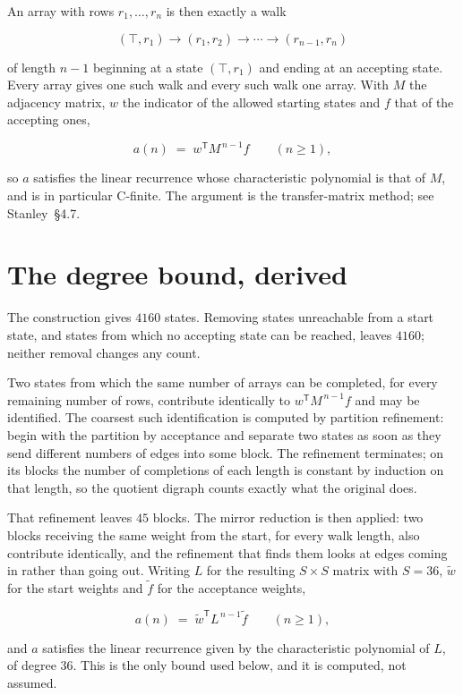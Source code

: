 \documentclass[11pt]{article}
\theoremstyle{definition}
\begin{document}
An array with rows $r_1,\dots,r_n$ is then exactly a walk

\[(\top,r_1) \to (r_1,r_2) \to \cdots \to (r_{n-1},r_n)\]

of length $n-1$ beginning at a state $(\top,r_1)$ and ending at an accepting state. Every array gives one such walk and every such walk one array. With $M$ the adjacency matrix, $w$ the indicator of the allowed starting states and $f$ that of the accepting ones,

\[a(n) \;=\; w^{\mathsf T} M^{\,n-1} f \qquad (n \ge 1),\]

so $a$ satisfies the linear recurrence whose characteristic polynomial is that of $M$, and is in particular C-finite. The argument is the transfer-matrix method; see Stanley~\S4.7.

\section{The degree bound, derived}

The construction gives $4160$ states. Removing states unreachable from a start state, and states from which no accepting state can be reached, leaves $4160$; neither removal changes any count.

Two states from which the same number of arrays can be completed, for every remaining number of rows, contribute identically to $w^{\mathsf T}M^{\,n-1}f$ and may be identified. The coarsest such identification is computed by partition refinement: begin with the partition by acceptance and separate two states as soon as they send different numbers of edges into some block. The refinement terminates; on its blocks the number of completions of each length is constant by induction on that length, so the quotient digraph counts exactly what the original does.

That refinement leaves $45$ blocks. The mirror reduction is then applied: two blocks receiving the same weight from the start, for every walk length, also contribute identically, and the refinement that finds them looks at edges coming in rather than going out. Writing $L$ for the resulting $S \times S$ matrix with $S = 36$, $\tilde w$ for the start weights and $\tilde f$ for the acceptance weights,

\[a(n) \;=\; \tilde w^{\mathsf T} L^{\,n-1} \tilde f \qquad (n \ge 1),\]

and $a$ satisfies the linear recurrence given by the characteristic polynomial of $L$, of degree $36$. This is the only bound used below, and it is computed, not assumed.
\end{document}
